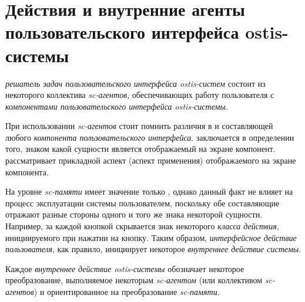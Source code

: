 \section{Действия и внутренние агенты пользовательского интерфейса ostis-системы}
\label{sec_interfaces_actions_and_agents}

\textit{решатель задач пользовательского интерфейса ostis-систем} состоит из некоторого коллектива \textit{sc-агентов}, обеспечивающих работу пользователя с \textit{компонентами пользовательского интерфейса ostis-системы}.

При использовании \textit{sc-агентов} стоит помнить различия в  и  составляющей любого \textit{компонента пользовательского интерфейса}.  заключается в определении того, знаком какой сущности является отображаемый на экране компонент.  рассматривает прикладной аспект (аспект применения) отображаемого на экране компонента.

На уровне \textit{sc-памяти} имеет значение только , однако данный факт не влияет на процесс эксплуатации системы пользователем, поскольку обе составляющие отражают разные стороны одного и того же знака некоторой сущности. Например, за каждой кнопкой скрывается знак некоторого \textit{класса действия}, инициируемого при нажатии на кнопку. Таким образом, \textit{интерфейсное действие пользователя}, как правило, инициирует некоторое \textit{внутреннее действие системы}. 

\begin{SCn}



\end{SCn}
	
Каждое \textit{внутреннее действие ostis-системы} обозначает некоторое преобразование, выполняемое некоторым \textit{sc-агентом} (или коллективом \textit{sc-агентов}) и ориентированное на преобразование \textit{sc-памяти}.

\begin{SCn}


\end{SCn}

